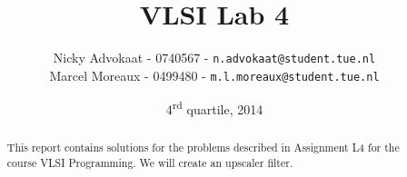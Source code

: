 \documentclass[a4paper,twoside,11pt]{article}
\title{\vspace{-\baselineskip}\sffamily\bfseries VLSI Lab 4}
\author{
Nicky Advokaat - 0740567 - {\tt n.advokaat@student.tue.nl} \\
Marcel  Moreaux - 0499480 - {\tt  m.l.moreaux@student.tue.nl}\\
}
\date{4\textsuperscript{rd} quartile, 2014}
\numberwithin{equation}{section}
\begin{document}
\maketitle
\thispagestyle{empty}
\begin{abstract}
This report contains solutions for the problems described in Assignment L4 for the course VLSI Programming. We will create an upscaler filter.
\end{abstract}

\tableofcontents

\newpage








\end{document}

